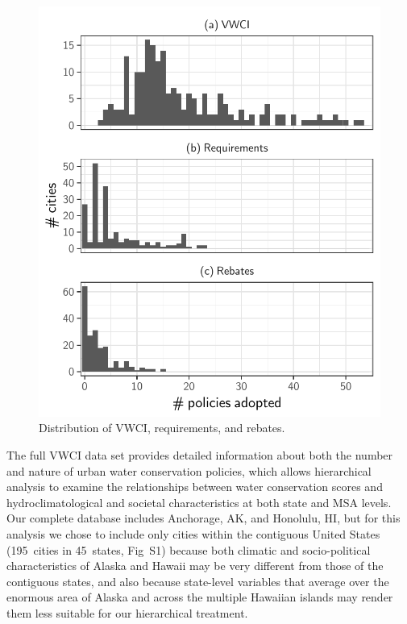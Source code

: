 \documentclass[draft,linenumbers]{agujournal}\usepackage{knitr}
\begin{document}
\begin{figure}[tb]

{\centering \includegraphics[width=0.8\linewidth]{figure/vwci_histogram-1}

}

\caption[Distribution of VWCI, requirements, and rebates]{Distribution of VWCI, requirements, and rebates.}\label{fig:vwci_histogram}
\end{figure}


The full VWCI data set provides detailed information about both the number and nature of urban water conservation policies, which  allows hierarchical analysis to examine the relationships between water conservation scores and hydroclimatological and societal characteristics at both state and MSA levels.
Our complete database includes Anchorage, AK, and Honolulu, HI, but for this analysis we chose to include only cities within the contiguous United States (195~cities in 45~states, Fig~S1)  because both climatic and socio-political characteristics of Alaska and Hawaii may be very different from those of the contiguous states, and also because state-level variables that average over the enormous area of Alaska and across the multiple Hawaiian islands may render them less suitable for our hierarchical treatment.
\end{document}
